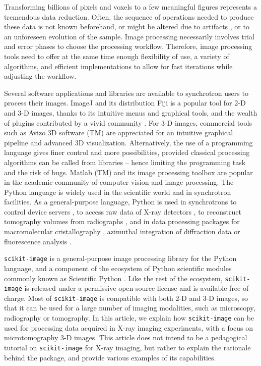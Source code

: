 \documentclass[twocolumn]{bmcart}%
\begin{document}
Transforming billions of pixels and voxels to a few meaningful figures
represents a tremendous data reduction. Often, the sequence of operations
needed to produce these data is not known beforehand, or might be altered
due to artifacts \citep{Marone2010}, or to an unforeseen evolution of
the sample. Image processing necessarily involves trial and error phases
to choose the processing workflow. Therefore, image processing tools need
to offer at the same time enough flexibility of use, a variety of
algorithms, and efficient implementations to allow for fast iterations
while adjusting the workflow.

Several software applications and libraries are available to synchrotron
users to process their images. ImageJ \citep{Abramoff2004, Schneider2012}
and its distribution Fiji \citep{Schindelin2012} is a popular tool for
2-D and 3-D images, thanks to its intuitive menus and graphical tools,
and the wealth of plugins contributed by a vivid
community \citep{Schindelin2015}. For 3-D images, commercial tools such
as Avizo 3D software (TM) are appreciated for an intuitive graphical
pipeline and advanced 3D visualization. Alternatively, the use of a
programming language gives finer control and more possibilities, provided
classical processing algorithms can be called from libraries -- hence
limiting the programming task and the risk of bugs. Matlab (TM) and its
image processing toolbox are popular in the academic community of
computer vision and image processing. The Python language is widely used
in the scientific world and in synchrotron facilities. As a
general-purpose language, Python is used in synchrotrons to control
device servers \citep{pytango}, to access raw data of X-ray
detectors \citep{Knudsen2013}, to reconstruct tomography volumes from
radiographs \citep{Gursoy2014, Mirone2014}, and in data
processing packages for macromolecular cristallography \citep{Adams2010},
azimuthal integration of diffraction data \citep{Ashiotis2015} or
fluorescence analysis \citep{pymca}.

\texttt{scikit-image} \citep{Vanderwalt2014} is a general-purpose image
processing library for the Python language, and a component of the ecosystem of
Python scientific modules commonly known as Scientific
Python \citep{Oliphant2007}. Like the rest of the ecosystem,
\texttt{scikit-image} is released under a permissive open-source license and is
available free of charge. Most of \texttt{scikit-image} is compatible with both 2-D and
3-D images, so that it can be used for a large number of imaging modalities,
such as microscopy, radiography or tomography. In this article, we explain how
\texttt{scikit-image} can be used for processing data acquired in X-ray
imaging experiments, with a focus on microtomography 3-D images. This
article does not intend to be a pedagogical tutorial on \texttt{scikit-image}
for X-ray imaging, but rather to explain the rationale behind the package, and
provide various examples of its capabilities.
\end{document}
